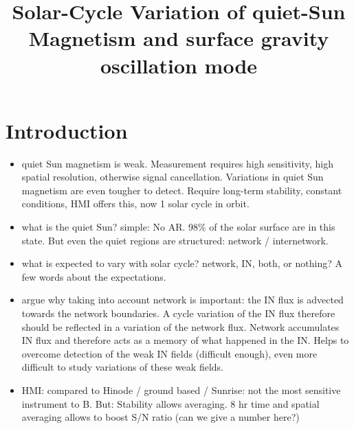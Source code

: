 \documentclass{aa}
\begin{document}
\title{Solar-Cycle Variation of quiet-Sun Magnetism and surface gravity oscillation mode}






\maketitle

\section{Introduction} \label{sec:intro}

\begin{itemize}
\item quiet Sun magnetism is weak. Measurement requires high sensitivity, high spatial resolution, otherwise signal cancellation. Variations in quiet Sun magnetism are even tougher to detect. Require long-term stability, constant conditions, HMI offers this, now 1 solar cycle in orbit. 
\item what is the quiet Sun? simple: No AR. 98\% of the solar surface are in this state. But even the quiet regions are structured: network / internetwork. 
\item what is expected to vary with solar cycle? network, IN, both, or nothing? A few words about the expectations.
\item argue why taking into account network is important: the IN flux is advected towards the network boundaries. A cycle variation of the IN flux therefore should be reflected in a variation of the network flux. Network accumulates IN flux and therefore acts as a memory of what happened in the IN. Helps to overcome detection of the weak IN fields (difficult enough), even more difficult to study variations of these weak fields.
\item HMI: compared to Hinode / ground based / Sunrise: not the most sensitive instrument to B. But: Stability allows averaging. 8 hr time and spatial averaging allows to boost S/N ratio (can we give a number here?)

\end{itemize}
\end{document}
